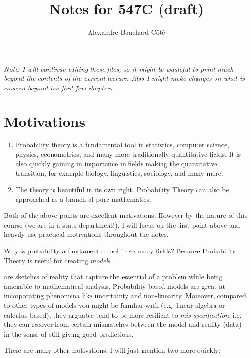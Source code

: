 \documentclass{article}
\title{Notes for 547C (draft)}
\author{Alexandre Bouchard-C\^ot\'e}
\begin{document}
\maketitle

\emph{Note: I will continue editing these files, so it might be wasteful to print much beyond the contents of the current lecture. Also I might make changes on what is covered beyond the first few chapters.}

\tableofcontents

\newpage

\section{Motivations}

\begin{enumerate}
	\item Probability theory is a fundamental tool in statistics, computer science, physics, econometrics, and many more traditionally quantitative fields. It is also quickly gaining in importance in fields making the quantitative transition, for example biology, linguistics, sociology, and many more. 
	\item The theory is beautiful in its own right. Probability Theory can also be approached as a branch of pure mathematics. 
\end{enumerate}
 
Both of the above points are excellent motivations. However by the nature of this course (we are in a stats department!), I will focus on the first point above and heavily use practical motivations throughout the notes. 

Why is probability a fundamental tool in so many fields? Because Probability Theory is useful for creating \emph{models}. 

 are sketches of reality that capture the essential of a problem while being amenable to mathematical analysis. Probability-based models are great at incorporating phenomena like uncertainty and non-linearity. Moreover, compared to other types of models you might be familiar with (e.g. linear algebra or calculus based), they arguable tend to be more resilient to \emph{mis-specification}, i.e. they can recover from certain mismatches between the model and reality (data) in the sense of still giving good predictions.

There are many other motivations. I will just mention two more quickly:
\end{document}
